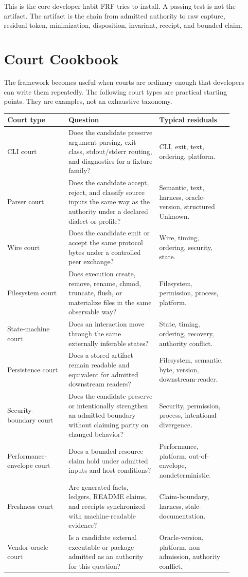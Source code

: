 \documentclass[11pt,a4paper]{article}
\newcommand{\frf}{\textsc{FRF}}
\begin{document}
This is the core developer habit \frf{} tries to install. A passing test is not the artifact. The artifact is the chain from admitted authority to raw capture, residual token, minimization, disposition, invariant, receipt, and bounded claim.

\section{Court Cookbook}
\label{sec:court-cookbook}

The framework becomes useful when courts are ordinary enough that developers can write them repeatedly. The following court types are practical starting points. They are examples, not an exhaustive taxonomy.

\begin{longtable}{>{\raggedright\arraybackslash}p{0.25\linewidth}>{\raggedright\arraybackslash}p{0.37\linewidth}>{\raggedright\arraybackslash}p{0.30\linewidth}}
\toprule
\textbf{Court type} & \textbf{Question} & \textbf{Typical residuals} \\
\midrule
\endhead
CLI court & Does the candidate preserve argument parsing, exit class, stdout/stderr routing, and diagnostics for a fixture family? & CLI, exit, text, ordering, platform. \\
Parser court & Does the candidate accept, reject, and classify source inputs the same way as the authority under a declared dialect or profile? & Semantic, text, harness, oracle-version, structured Unknown. \\
Wire court & Does the candidate emit or accept the same protocol bytes under a controlled peer exchange? & Wire, timing, ordering, security, state. \\
Filesystem court & Does execution create, remove, rename, chmod, truncate, flush, or materialize files in the same observable way? & Filesystem, permission, process, platform. \\
State-machine court & Does an interaction move through the same externally inferable states? & State, timing, ordering, recovery, authority conflict. \\
Persistence court & Does a stored artifact remain readable and equivalent for admitted downstream readers? & Filesystem, semantic, byte, version, downstream-reader. \\
Security-boundary court & Does the candidate preserve or intentionally strengthen an admitted boundary without claiming parity on changed behavior? & Security, permission, process, intentional divergence. \\
Performance-envelope court & Does a bounded resource claim hold under admitted inputs and host conditions? & Performance, platform, out-of-envelope, nondeterministic. \\
Freshness court & Are generated facts, ledgers, README claims, and receipts synchronized with machine-readable evidence? & Claim-boundary, harness, stale-documentation. \\
Vendor-oracle court & Is a candidate external executable or package admitted as an authority for this question? & Oracle-version, platform, non-admission, authority conflict. \\
\bottomrule
\end{longtable}
\end{document}
